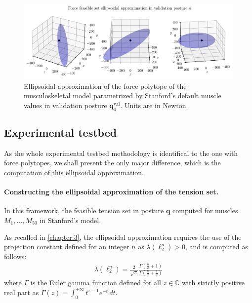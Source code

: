 \begin{figure}[!htb]
    \centering
    \captionsetup{justification=centering}
    \begin{minipage}{\linewidth}
        \centering
        \includegraphics[trim={0 0 0 0}, clip, width=1\linewidth]{img/chapter_4/reconstruction_stanford_imgs/STANFORD_ELLIPSOID_POSTURE_VAL_04.pdf}
    \end{minipage}
    \caption{Ellipsoidal approximation of the force polytope of the musculoskeletal model parametrized by Stanford's default muscle values in validation posture $\mathbf{q}_4^{\text{val}}$. Units are in Newton.}
    \label{fig:ellipsoid_val_pose_4}
\end{figure}

\subsection{Experimental testbed}
As the whole experimental testbed methodology is identifical to the one with force polytopes, we shall present the only major difference, which is the computation of this ellipsoidal approximation.


\paragraph*{Constructing the ellipsoidal approximation of the tension set.}
In this framework, the feasible tension set in posture $\mathbf{q}$ computed for muscles $M_1, \dots, M_{50}$ in Stanford's model. 

As recalled in \ref{chapter:3}, the ellipsoidal approximation requires the use of the projection constant defined for an integer $n$ as $\lambda(\ell_2^{n}) > 0$, and is computed as follows: 
\begin{align*}
    \lambda(\ell_2^{n}) = \frac{2}{\sqrt{\pi}}\frac{\Gamma(\frac{n}{2} + 1)}{\Gamma(\frac{n}{2} + \frac{1}{2})}
\end{align*}
where $\Gamma$ is the Euler gamma function defined for all $z\in \mathbb{C}$ with strictly positive real part as $\Gamma(z)=\int_0^{+\infty}t^{z-1}e^{-t}\,dt$.

